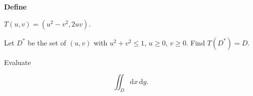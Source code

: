 \textbf{Define}

\(T(u,v) = (u^2 - v^2, 2uv)\).

Let \(D^*\) be the set of \((u,v)\) with \(u^2 + v^2 \leq 1\), \(u \geq 0\), \(v \geq 0\). Find \(T(D^*) = D\).

Evaluate

\[
\iint_D \mathrm{d}x \, \mathrm{d}y.
\]
